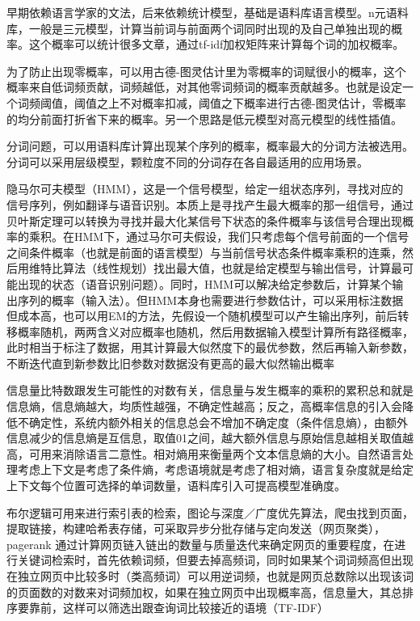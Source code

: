 \documentclass[]{book}
\begin{document}
早期依赖语言学家的文法，后来依赖统计模型，基础是语料库语言模型。n元语料库，一般是三元模型，计算当前词与前面两个词同时出现的及自己单独出现的概率。这个概率可以统计很多文章，通过tf-idf加权矩阵来计算每个词的加权概率。

为了防止出现零概率，可以用古德-图灵估计里为零概率的词赋很小的概率，这个概率来自低词频贡献，词频越低，对其他零词频词的概率贡献越多。也就是设定一个词频阈值，阈值之上不对概率扣减，阈值之下概率进行古德-图灵估计，零概率的均分前面打折省下来的概率。另一个思路是低元模型对高元模型的线性插值。

分词问题，可以用语料库计算出现某个序列的概率，概率最大的分词方法被选用。分词可以采用层级模型，颗粒度不同的分词存在各自最适用的应用场景。

隐马尔可夫模型（HMM），这是一个信号模型，给定一组状态序列，寻找对应的信号序列，例如翻译与语音识别。本质上是寻找产生最大概率的那一组信号，通过贝叶斯定理可以转换为寻找并最大化某信号下状态的条件概率与该信号合理出现概率的乘积。在HMM下，通过马尔可夫假设，我们只考虑每个信号前面的一个信号之间条件概率（也就是前面的语言模型）与当前信号状态条件概率乘积的连乘，然后用维特比算法（线性规划）找出最大值，也就是给定模型与输出信号，计算最可能出现的状态（语音识别问题）。同时，HMM可以解决给定参数后，计算某个输出序列的概率（输入法）。但HMM本身也需要进行参数估计，可以采用标注数据但成本高，也可以用EM的方法，先假设一个随机模型可以产生输出序列，前后转移概率随机，两两含义对应概率也随机，然后用数据输入模型计算所有路径概率，此时相当于标注了数据，用其计算最大似然度下的最优参数，然后再输入新参数，不断迭代直到新参数比旧参数对数据没有更高的最大似然输出概率

信息量比特数跟发生可能性的对数有关，信息量与发生概率的乘积的累积总和就是信息熵，信息熵越大，均质性越强，不确定性越高；反之，高概率信息的引入会降低不确定性，系统内额外相关的信息总会不增加不确定度（条件信息熵），由额外信息减少的信息熵是互信息，取值01之间，越大额外信息与原始信息越相关取值越高，可用来消除语言二意性。相对熵用来衡量两个文本信息熵的大小。自然语言处理考虑上下文是考虑了条件熵，考虑语境就是考虑了相对熵，语言复杂度就是给定上下文每个位置可选择的单词数量，语料库引入可提高模型准确度。

布尔逻辑可用来进行索引表的检索，图论与深度／广度优先算法，爬虫找到页面，提取链接，构建哈希表存储，可采取异步分批存储与定向发送（网页聚类），pagerank 通过计算网页链入链出的数量与质量迭代来确定网页的重要程度，在进行关键词检索时，首先依赖词频，但要去掉高频词，同时如果某个词词频高但出现在独立网页中比较多时（类高频词）可以用逆词频，也就是网页总数除以出现该词的页面数的对数来对词频加权，如果在独立网页中出现概率高，信息量大，其总排序要靠前，这样可以筛选出跟查询词比较接近的语境（TF-IDF）
\end{document}
